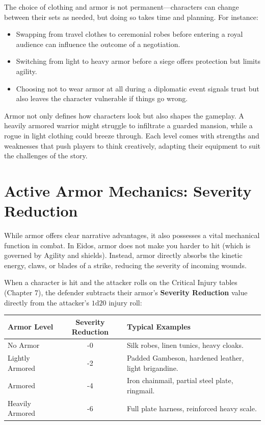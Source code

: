 The choice of clothing and armor is not permanent—characters can change between their sets as needed, but doing so takes time and planning. For instance:

\begin{itemize}
    \item Swapping from travel clothes to ceremonial robes before entering a royal audience can influence the outcome of a negotiation.
    \item Switching from light to heavy armor before a siege offers protection but limits agility.
    \item Choosing not to wear armor at all during a diplomatic event signals trust but also leaves the character vulnerable if things go wrong.
\end{itemize}

Armor not only defines how characters look but also shapes the gameplay. A heavily armored warrior might struggle to infiltrate a guarded mansion, while a rogue in light clothing could breeze through. Each level comes with strengths and weaknesses that push players to think creatively, adapting their equipment to suit the challenges of the story.

\section{Active Armor Mechanics: Severity Reduction}

While armor offers clear narrative advantages, it also possesses a vital mechanical function in combat. In Eidos, armor does not make you harder to hit (which is governed by Agility and shields). Instead, armor directly absorbs the kinetic energy, claws, or blades of a strike, reducing the severity of incoming wounds.

When a character is hit and the attacker rolls on the Critical Injury tables (Chapter 7), the defender subtracts their armor's \textbf{Severity Reduction} value directly from the attacker's $1\text{d}20$ injury roll:

\begin{center}
\begin{tabular}{lcp{8cm}}
\hline
\textbf{Armor Level} & \textbf{Severity Reduction} & \textbf{Typical Examples} \\ \hline
No Armor & -0 & Silk robes, linen tunics, heavy cloaks. \\
Lightly Armored & -2 & Padded Gambeson, hardened leather, light brigandine. \\
Armored & -4 & Iron chainmail, partial steel plate, ringmail. \\
Heavily Armored & -6 & Full plate harness, reinforced heavy scale. \\ \hline
\end{tabular}
\end{center}

